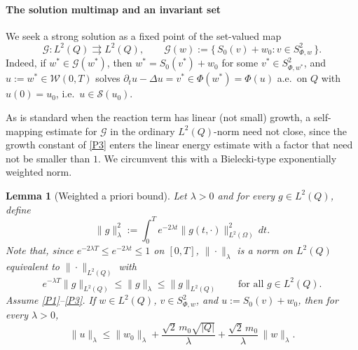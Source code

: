 \documentclass[11pt]{elsarticle}
\newtheorem{lemma}[theorem]{Lemma}
\theoremstyle{definition}
\theoremstyle{remark}
\numberwithin{equation}{section}
\begin{document}
\paragraph{The solution multimap and an invariant set}
We seek a strong solution as a fixed point of the set-valued map
\begin{equation}\label{eq:bk-G-def}
	\mathcal{G}:L^2(Q)\rightrightarrows L^2(Q),
	\qquad
	\mathcal{G}(w):=\bigl\{\,S_0(v)+w_0 : v\in S^2_{\Phi,w}\,\bigr\}.
\end{equation}
Indeed, if $w^\ast\in\mathcal{G}(w^\ast)$, then
$w^\ast=S_0(v^\ast)+w_0$ for some $v^\ast\in S^2_{\Phi,w^\ast}$, and
$u:=w^\ast\in\mathcal{W}(0,T)$ solves $\partial_t u-\Delta u=v^\ast\in
\Phi(w^\ast)=\Phi(u)$ a.e.\ on $Q$ with $u(0)=u_0$, i.e.\
$u\in\mathcal{S}(u_0)$.

As is standard when the reaction term has linear (not small) growth, a
self-mapping estimate for $\mathcal{G}$ in the ordinary $L^2(Q)$-norm
need not close, since the growth constant of \ref{P3} enters the
linear energy estimate with a factor that need not be smaller than $1$.
We circumvent this with a Bielecki-type exponentially weighted norm.

\begin{lemma}[Weighted a priori bound]
	\label{lem:bk-bielecki}
	Let $\lambda>0$ and for every $g\in L^2(Q)$, define
	\[
	\|g\|_\lambda^2:=\int_0^T e^{-2\lambda t}
	\|g(t,\cdot)\|_{L^2(\Omega)}^2\,dt.
	\]
	Note that, since $e^{-2\lambda T}\le e^{-2\lambda t}\le1$ on $[0,T]$,
	$\|\cdot\|_\lambda$ is a norm on $L^2(Q)$ equivalent to
	$\|\cdot\|_{L^2(Q)}$ with
	\begin{equation}\label{eq:bk-norm-equiv}
		e^{-\lambda T}\|g\|_{L^2(Q)}\le\|g\|_\lambda\le\|g\|_{L^2(Q)}
		\qquad\text{for all } g\in L^2(Q).
	\end{equation}
	Assume {\rm \ref{P1}--\ref{P3}}. If $w\in L^2(Q)$, $v\in S^2_{\Phi,w}$,
	and $u:=S_0(v)+w_0$, then for every $\lambda>0$,
	\[
	\|u\|_\lambda
	\le
	\|w_0\|_\lambda
	+\frac{\sqrt2\,m_0\sqrt{|Q|}}{\lambda}
	+\frac{\sqrt2\,m_0}{\lambda}\,\|w\|_\lambda.
	\]
\end{lemma}
\end{document}
